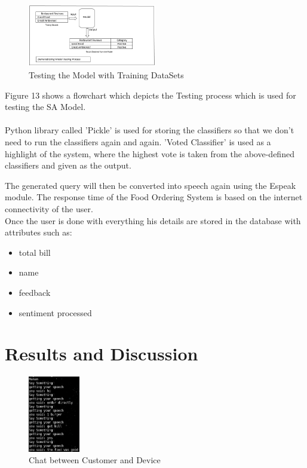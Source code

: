 \documentclass[conference]{IEEEtran}
\begin{document}
\begin{figure}[!ht]
	\centering
	\includegraphics[width=0.5\textwidth]{test.png}
	\caption{Testing the Model with Training DataSets}
\end{figure}

Figure 13 shows a flowchart which depicts the Testing process which is used for testing the SA Model.\\\\
Python library called 'Pickle' is used for storing the classifiers so that we don't need to run the classifiers again and again. 'Voted Classifier' is used as a highlight of the system, where the highest vote is taken from the above-defined classifiers and given as the output.

\bigskip
The generated query will then be converted into speech again using the Espeak module.
The response time of the Food Ordering System is based on the internet connectivity of the user.\\
Once the user is done with everything his details are stored in the database with attributes such as:
\begin{itemize}
	\item total bill
	\item name
	\item feedback
	\item sentiment processed
\end{itemize}

	
	
	\section{Results and Discussion}
	\begin{figure}[!ht]
		\centering
		\includegraphics[width=0.2\textwidth]{input.png}
		\caption{Chat between Customer and Device}
	\end{figure}
	
\end{document}
